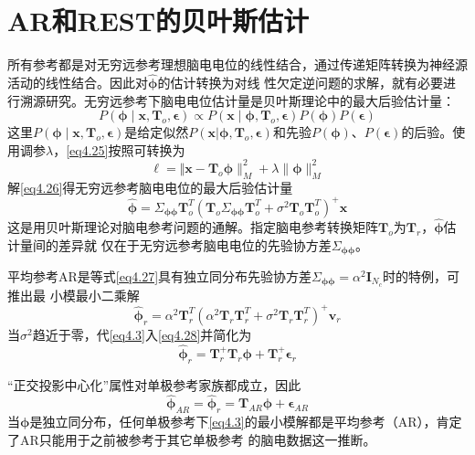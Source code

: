 \section{AR和REST的贝叶斯估计}
所有参考都是对无穷远参考理想脑电电位的线性结合，通过传递矩阵转换为神经源活动的线性结合。因此对$\hat{\mathbf{\phi}}$的估计转换为对线
性欠定逆问题的求解，就有必要进行溯源研究。无穷远参考下脑电电位估计量是贝叶斯理论中的最大后验估计量：
\begin{equation}\label{eq4.25}
P(\mathbf{\phi}\mid\mathbf{x},\mathbf{T}_o,\mathbf{\epsilon})\propto{P(\mathbf{x}\mid\mathbf{\phi},\mathbf{T}_o,\mathbf{\epsilon})P(\mathbf{\phi})P(\mathbf{\epsilon})}
\end{equation}
这里$P(\mathbf{\phi}\mid\mathbf{x},\mathbf{T}_o,\mathbf{\epsilon})$是给定似然$P(\mathbf{x}|\mathbf{\phi},\mathbf{T}_o,\mathbf{\epsilon})$和先验$P(\mathbf{\phi})$、$P(\mathbf{\epsilon})$的后验。使用调参$\lambda$，\eqref{eq4.25}按照\cite{noauthor_mardia_nodate}可转换为
\begin{equation}\label{eq4.26}
\ell = \Vert\mathbf{x}-\mathbf{T}_o\mathbf{\phi}\rVert_M^2+\lambda\lVert\mathbf{\phi}\rVert_M^2
\end{equation}
解\eqref{eq4.26}得无穷远参考脑电电位的最大后验估计量
\begin{equation}\label{eq4.27}
\hat{\mathbf{\phi}}=\Sigma_\mathbf{\phi\phi}\mathbf{T}_o^T(\mathbf{T}_o\Sigma_\mathbf{\phi\phi}\mathbf{T}_o^T+\sigma^2\mathbf{T}_o\mathbf{T}_o^T)^+\mathbf{x}
\end{equation}
这是用贝叶斯理论对脑电参考问题的通解。指定脑电参考转换矩阵$\mathbf{T}_o$为$\mathbf{T}_r$，$\hat{\mathbf{\phi}}$估计量间的差异就
仅在于无穷远参考脑电电位的先验协方差$\Sigma_{\mathbf{\phi\phi}}$。

平均参考AR是等式\eqref{eq4.27}具有独立同分布先验协方差$\Sigma_{\mathbf{\phi\phi}}=\alpha^2\mathbf{I}_{N_c}$时的特例，可推出最
小模最小二乘解
\begin{equation}\label{eq4.28}
\hat{\mathbf{\phi}}_r=\alpha^2\mathbf{T}_r^T(\alpha^2\mathbf{T}_r\mathbf{T}_r^T+\sigma^2\mathbf{T}_r\mathbf{T}_r^T)^+\mathbf{v}_r
\end{equation}
当$\sigma^2$趋近于零，代\eqref{eq4.3}入\eqref{eq4.28}并简化为
\begin{equation}\label{eq4.29}
\hat{\mathbf{\phi}}_r=\mathbf{T}_r^+\mathbf{T}_r\mathbf{\phi}+\mathbf{T}_r^+\mathbf{\epsilon}_r
\end{equation}

“正交投影中心化”属性对单极参考家族都成立，因此
\begin{equation}\label{eq4.30}
\hat{\mathbf{\phi}}_{AR}=\hat{\mathbf{\phi}}_r=\mathbf{T}_{AR}\mathbf{\phi}+\mathbf{\epsilon}_{AR}
\end{equation}
当$\mathbf{\phi}$是独立同分布，任何单极参考下\eqref{eq4.3}的最小模解都是平均参考（AR），肯定了AR只能用于之前被参考于其它单极参考
的脑电数据这一推断。

